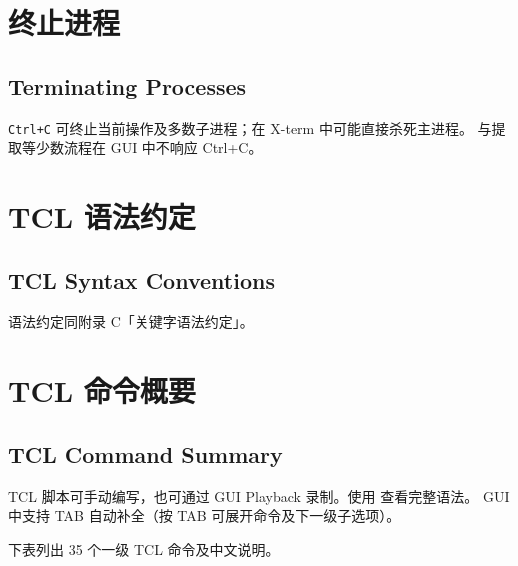\section{终止进程}
\subsection*{Terminating Processes}

\texttt{Ctrl+C} 可终止当前操作及多数子进程；在 X-term 中可能直接杀死主进程。
 与提取等少数流程在 GUI 中不响应 Ctrl+C。

\section{TCL 语法约定}
\subsection*{TCL Syntax Conventions}

语法约定同附录 C「关键字语法约定」。

\section{TCL 命令概要}
\subsection*{TCL Command Summary}

TCL 脚本可手动编写，也可通过 GUI Playback 录制。使用  查看完整语法。
GUI 中支持 TAB 自动补全（按 TAB 可展开命令及下一级子选项）。

下表列出 35 个一级 TCL 命令及中文说明。

